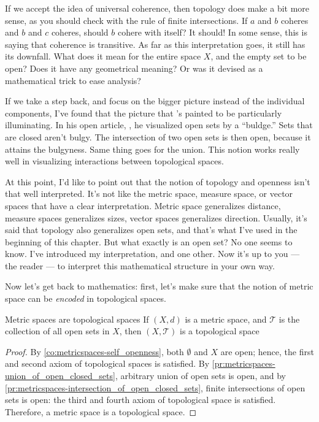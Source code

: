 If we accept the idea of universal coherence, then topology does make a bit more sense,
as you should check with the rule of finite intersections. If \(a\) and \(b\) coheres
and \(b\) and \(c\) coheres, should \(b\) cohere with itself? It should! In some sense,
this is saying that coherence is transitive. As far as this interpretation goes, it still
has its downfall. What does it mean for the entire space \(X\), and the empty set to be open?
Does it have any geometrical meaning? Or was it devised as a mathematical trick to ease analysis?

If we take a step back, and focus on the bigger picture instead of the individual
components, I've found that the picture that \citeauthor{vakil-exact-sequences}'s painted
to be particularly illuminating. In his open article, ,
he visualized open sets by a \enquote{buldge.} Sets that are closed aren't bulgy. The
intersection of two open sets is then open, because it attains the bulgyness. Same thing goes
for the union. This notion works really well in visualizing interactions between topological spaces.

At this point, I'd like to point out that the notion of topology and openness isn't that well
interpreted. It's not like the metric space, measure space, or vector spaces that have
a clear interpretation. Metric space generalizes distance, measure spaces generalizes
sizes, vector spaces generalizes direction. Usually, it's said that topology also
generalizes open sets, and that's what I've used in the beginning of this chapter. But
what exactly is an open set? No one seems to know. I've introduced my interpretation, and one other.
Now it's up to you --- the reader --- to interpret this mathematical structure in your own way.

Now let's get back to mathematics: first, let's make sure that the notion of metric
space can be \emph{encoded} in topological spaces.
\begin{cor}{Metric spaces are topological spaces}{}
  If \((X, d)\) is a metric space, and \(\mathcal{T}\) is the collection of all open
  sets in \(X\), then \((X, \mathcal{T})\) is a topological space
\end{cor}

\begin{proof}
  By \cref{co:metricspaces-self_openness}, both \(\emptyset\) and \(X\) are open;
  hence, the first and second axiom of topological spaces is satisfied. By
  \cref{pr:metricspaces-union_of_open_closed_sets}, arbitrary union of open sets is open,
  and by \cref{pr:metricspaces-intersection_of_open_closed_sets}, finite intersections
  of open sets is open: the third and fourth axiom of topological space is satisfied.
  Therefore, a metric space is a topological space.
\end{proof}

